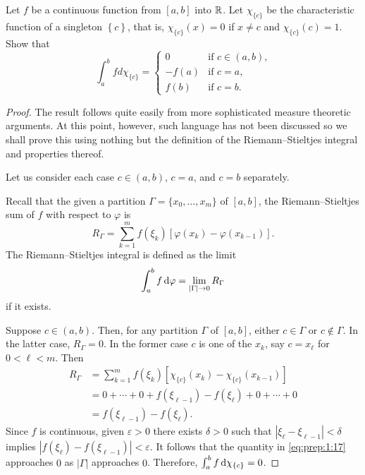 \begin{problem}
Let $f$ be a continuous function from $[a,b]$ into $\mathbb{R}$. Let
$\chi_{\{c\}}$ be the characteristic function of a singleton
$\left\{c\right\}$, that is, $\chi_{\{c\}}(x)=0$ if $x\neq c$ and
$\chi_{\{c\}}(c)=1$. Show that
\[
\int_a^b f d \chi_{\{c\}}=
\begin{cases}
0&\text{if $c\in(a,b)$,}\\
-f(a)&\text{if $c=a$,}\\
f(b)&\text{if $c=b$.}
\end{cases}
\]
\end{problem}
\begin{proof}
The result follows quite easily from more sophisticated measure theoretic
arguments. At this point, however, such language has not been discussed so
we shall prove this using nothing but the definition of the
Riemann--Stieltjes integral and properties thereof.

Let us consider each case $c\in(a,b)$, $c=a$, and $c=b$ separately.

Recall that the given a partition $\Gamma=\{x_0,\dotsc,x_m\}$ of $[a,b]$,
the Riemann--Stieltjes sum of $f$ with respect to $\varphi$ is
\begin{equation}
  \label{eq:prep:1:15}
R_\Gamma=\sum_{k=1}^mf(\xi_k)[\varphi(x_k)-\varphi(x_{k-1})].
\end{equation}
The Riemann--Stieltjes integral is defined as the limit
\begin{equation}
\label{eq:prep:1:16}
\int_a^b f\mathop{}\!\mathrm{d}\varphi=\lim_{|\Gamma|\to 0} R_\Gamma
\end{equation}
if it exists.

Suppose $c\in(a,b)$. Then, for any partition $\Gamma$ of $[a,b]$, either
$c\in\Gamma$ or $c\notin\Gamma$. In the latter case, $R_\Gamma=0$. In the
former case $c$ is one of the $x_k$, say $c=x_\ell$ for $0<\ell<m$. Then
\begin{equation}
\label{eq:prep:1:17}
\begin{aligned}
R_\Gamma&=\sum_{k=1}^mf(\xi_k)[\chi_{\{c\}}(x_k)-\chi_{\{c\}}(x_{k-1})]\\
&=0+\dotsb+0+f(\xi_{\ell-1})-f(\xi_\ell)+0+\dotsb+0\\
&=f(\xi_{\ell-1})-f(\xi_\ell).
\end{aligned}
\end{equation}
Since $f$ is continuous, given $\varepsilon>0$ there exists $\delta>0$ such
that $|\xi_\ell-\xi_{\ell-1}|<\delta$ implies
$|f(\xi_{\ell})-f(\xi_{\ell-1})|<\varepsilon$. It follows that the quantity
in \eqref{eq:prep:1:17} approaches $0$ as $|\Gamma|$ approaches
$0$. Therefore, $\int_a^b f\mathop{}\!\mathrm{d}\chi_{\{c\}}=0$.


\end{proof}
